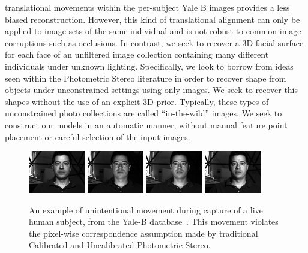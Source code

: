 translational movements within the per-subject Yale B images provides a less
biased reconstruction. However, this kind of translational alignment can only
be applied to image sets of the same individual and is not robust to common
image corruptions such as occlusions. In contrast, we seek to recover a 3D
facial surface for each face of an unfiltered image collection containing
many different individuals under unknown lighting.
Specifically, we look to borrow from ideas seen within the Photometric Stereo
literature in order to recover shape from objects under unconstrained settings
using only images. We seek to recover this shapes without the use of an explicit 
3D prior. Typically, these types of unconstrained
photo collections are called ``in-the-wild'' images. We seek to construct our 
models in an automatic manner, without manual feature point placement or 
careful selection of the input images.
\begin{figure}
    \hspace*{\fill}
    \includegraphics[width=0.22\textwidth]{collection_ps/images/yaleb/yaleB06_P00A+000E+20} \hfill
    \includegraphics[width=0.22\textwidth]{collection_ps/images/yaleb/yaleB06_P00A+000E-20} \hfill
    \includegraphics[width=0.22\textwidth]{collection_ps/images/yaleb/yaleB06_P00A+005E-10} \hfill
    \includegraphics[width=0.22\textwidth]{collection_ps/images/yaleb/yaleB06_P00A-020E+10}
    \hspace*{\fill}
    \caption{An example of unintentional movement during capture of a live
             human subject, from the Yale-B database~\cite{georghiades2001fromfew}.
             This movement violates the pixel-wise correspondence assumption
             made by traditional Calibrated and Uncalibrated Photometric
             Stereo.}
\label{fig:imag_coll_yaleb_movement_example}
\end{figure}

